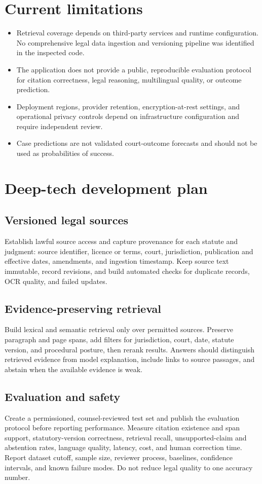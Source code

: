 \documentclass[11pt]{article}
\begin{document}
\section{Current limitations}
\begin{itemize}[leftmargin=*]
  \item Retrieval coverage depends on third-party services and runtime configuration. No comprehensive legal data ingestion and versioning pipeline was identified in the inspected code.
  \item The application does not provide a public, reproducible evaluation protocol for citation correctness, legal reasoning, multilingual quality, or outcome prediction.
  \item Deployment regions, provider retention, encryption-at-rest settings, and operational privacy controls depend on infrastructure configuration and require independent review.
  \item Case predictions are not validated court-outcome forecasts and should not be used as probabilities of success.
\end{itemize}

\section{Deep-tech development plan}
\subsection{Versioned legal sources}
Establish lawful source access and capture provenance for each statute and judgment: source identifier, licence or terms, court, jurisdiction, publication and effective dates, amendments, and ingestion timestamp. Keep source text immutable, record revisions, and build automated checks for duplicate records, OCR quality, and failed updates.

\subsection{Evidence-preserving retrieval}
Build lexical and semantic retrieval only over permitted sources. Preserve paragraph and page spans, add filters for jurisdiction, court, date, statute version, and procedural posture, then rerank results. Answers should distinguish retrieved evidence from model explanation, include links to source passages, and abstain when the available evidence is weak.

\subsection{Evaluation and safety}
Create a permissioned, counsel-reviewed test set and publish the evaluation protocol before reporting performance. Measure citation existence and span support, statutory-version correctness, retrieval recall, unsupported-claim and abstention rates, language quality, latency, cost, and human correction time. Report dataset cutoff, sample size, reviewer process, baselines, confidence intervals, and known failure modes. Do not reduce legal quality to one accuracy number.
\end{document}

